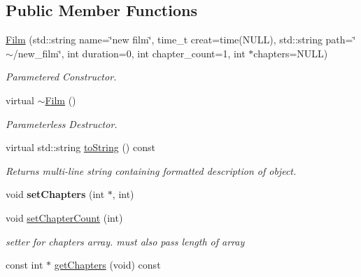 \subsection*{Public Member Functions}
\begin{DoxyCompactItemize}
\item 
\hypertarget{classFilm_a6ea805a054e1f43ec3963daf58ac7dd4}{\hyperlink{classFilm_a6ea805a054e1f43ec3963daf58ac7dd4}{Film} (std\-::string name=\char`\"{}new film\char`\"{}, time\-\_\-t creat=time(N\-U\-L\-L), std\-::string path=\char`\"{}$\sim$/new\-\_\-film\char`\"{}, int duration=0, int chapter\-\_\-count=1, int $\ast$chapters=N\-U\-L\-L)}\label{classFilm_a6ea805a054e1f43ec3963daf58ac7dd4}

\begin{DoxyCompactList}\small\item\em Parametered Constructor. \end{DoxyCompactList}\item 
virtual \hyperlink{classFilm_a8dab653f8a6c0635ca5ddbe0bbdd9a25}{$\sim$\-Film} ()
\begin{DoxyCompactList}\small\item\em Parameterless Destructor. \end{DoxyCompactList}\item 
\hypertarget{classFilm_ab88f7ac028cd45da81c96a50a2990fee}{virtual std\-::string \hyperlink{classFilm_ab88f7ac028cd45da81c96a50a2990fee}{to\-String} () const }\label{classFilm_ab88f7ac028cd45da81c96a50a2990fee}

\begin{DoxyCompactList}\small\item\em Returns multi-\/line string containing formatted description of object. \end{DoxyCompactList}\item 
\hypertarget{classFilm_a7cce5e45c3506a2b4150d43e3cba6813}{void {\bfseries set\-Chapters} (int $\ast$, int)}\label{classFilm_a7cce5e45c3506a2b4150d43e3cba6813}

\item 
\hypertarget{classFilm_a019b6375e91a6d6322a19a81de3b965d}{void \hyperlink{classFilm_a019b6375e91a6d6322a19a81de3b965d}{set\-Chapter\-Count} (int)}\label{classFilm_a019b6375e91a6d6322a19a81de3b965d}

\begin{DoxyCompactList}\small\item\em setter for chapters array. must also pass length of array \end{DoxyCompactList}\item 
\hypertarget{classFilm_ad0fa928009af1be1c176d06d55c14e11}{const int $\ast$ \hyperlink{classFilm_ad0fa928009af1be1c176d06d55c14e11}{get\-Chapters} (void) const }\label{classFilm_ad0fa928009af1be1c176d06d55c14e11}


\end{DoxyCompactItemize}
